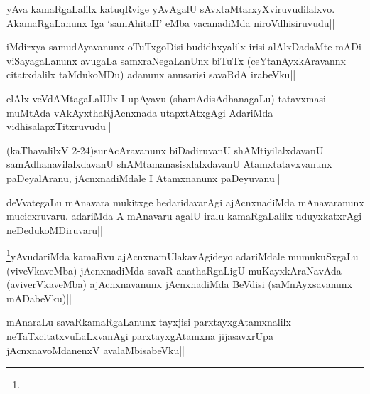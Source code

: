 \begin{artha}
yAva kamaRgaLalilx katuqRvige yAvAgalU sAvxtaMtarxyXviruvudilalxvo. AkamaRgaLanunx Iga `samAhitaH' eMba vacanadiMda niroVdhisiruvudu||
\end{artha}

\begin{artha}
iMdirxya samudAyavanunx oTuTxgoDisi budidhxyalilx irisi alAlxDadaMte mADi viSayagaLanunx avugaLa samxraNegaLanUnx biTuTx (ceYtanAyxkAravannx citatxdalilx taMdukoMDu) adanunx anusarisi savaRdA irabeVku||
\end{artha}

\begin{artha}
elAlx veVdAMtagaLalUlx I upAyavu (shamAdisAdhanagaLu) tatavxmasi muMtAda vAkAyxthaRjAcnxnada utapxtAtxgAgi AdariMda vidhisalapxTitxruvudu||
\end{artha}


\begin{artha}
(kaThavalilxV 2-24)surAcAravanunx biDadiruvanU shAMtiyilalxdavanU samAdhanavilalxdavanU shAMtamanasisxlalxdavanU Atamxtatavxvanunx paDeyalAranu, jAcnxnadiMdale I Atamxnanunx paDeyuvanu||
\end{artha}


\begin{artha}
deVvategaLu mAnavara mukitxge hedaridavarAgi ajAcnxnadiMda mAnavaranunx mucicxruvaru. adariMda A mAnavaru agalU iralu kamaRgaLalilx uduyxkatxrAgi neDedukoMDiruvaru||
\end{artha}

\begin{artha}
\footnote{}yAvudariMda kamaRvu ajAcnxnamUlakavAgideyo adariMdale mumukuSxgaLu (viveVkaveMba) jAcnxnadiMda savaR anathaRgaLigU muKayxkAraNavAda (aviverVkaveMba) ajAcnxnavanunx jAcnxnadiMda BeVdisi (saMnAyxsavanunx mADabeVku)||
\end{artha}


\begin{artha}
mAnaraLu savaRkamaRgaLanunx tayxjisi parxtayxgAtamxnalilx neTaTxcitatxvuLaLxvanAgi parxtayxgAtamxna jijasavxrUpa jAcnxnavoMdanenxV avalaMbisabeVku||
\end{artha}

